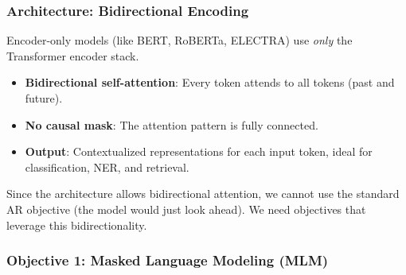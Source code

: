 \documentclass{article}
\begin{document}
\subsubsection{Architecture: Bidirectional Encoding}

Encoder-only models (like BERT, RoBERTa, ELECTRA) use \textit{only} the Transformer encoder stack.

\begin{itemize}
\item \textbf{Bidirectional self-attention}: Every token attends to all tokens (past and future).
\item \textbf{No causal mask}: The attention pattern is fully connected.
\item \textbf{Output}: Contextualized representations for each input token, ideal for classification, NER, and retrieval.
\end{itemize}

\begin{center}
\end{center}

Since the architecture allows bidirectional attention, we cannot use the standard AR objective (the model would just look ahead). We need objectives that leverage this bidirectionality.

\subsubsection{Objective 1: Masked Language Modeling (MLM)}
\end{document}
